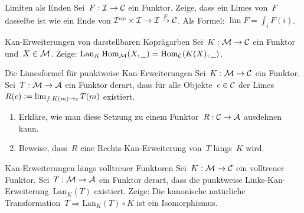 \documentclass{uebblatt}
\begin{document}

\begin{aufgabe}{Limiten als Enden}
Sei~$F : \mathcal{I} \to \mathcal{C}$ ein Funktor. Zeige, dass ein Limes von~$F$ dasselbe ist wie ein
Ende von $\mathcal{I}^{\mathrm{op}} \times \mathcal{I} \to \mathcal{I} \stackrel{F}{\to} \mathcal{C}$. Als Formel: $\lim F =
\int_i F(i)$.
\end{aufgabe}

\begin{aufgabe}{Kan-Erweiterungen von darstellbaren Koprägarben}
Sei~$K : \mathcal{M} \to \mathcal{C}$ ein Funktor und~$X \in \mathcal{M}$. Zeige:
$\operatorname{Lan}_K \mathrm{Hom}_{\mathcal{M}}(X, \underline{\ \ }) =
  \mathrm{Hom}_{\mathcal{C}}(K(X), \underline{\ \ })$.
\end{aufgabe}

\begin{aufgabe}{Die Limesformel für punktweise Kan-Erweiterungen}
Sei~$K : \mathcal{M} \to \mathcal{C}$ ein Funktor. Sei~$T : \mathcal{M} \to \mathcal{A}$ ein Funktor derart, dass
für alle Objekte~$c \in \mathcal{C}$ der Limes~$R(c) \vcentcolon= \lim_{f:K(m) \to c} T(m)$
existiert.
\begin{enumerate}
\item Erkläre, wie man diese Setzung zu einem Funktor~$R : \mathcal{C} \to \mathcal{A}$ ausdehnen
kann.
\item Beweise, dass~$R$ eine Rechts-Kan-Erweiterung von~$T$ längs~$K$ wird.
\end{enumerate}
\end{aufgabe}

\begin{aufgabe}{Kan-Erweiterungen längs volltreuer Funktoren}
Sei~$K : \mathcal{M} \to \mathcal{C}$ ein volltreuer Funktor. Sei~$T : \mathcal{M} \to \mathcal{A}$ ein Funktor
derart, dass die punktweise Links-Kan-Erweiterung~$\mathrm{Lan}_K(T)$
existiert. Zeige: Die kanonische natürliche Transformation~$T \Rightarrow
\mathrm{Lan}_K(T) \circ K$ ist ein Isomorphismus.
%
\end{aufgabe}
\end{document}
